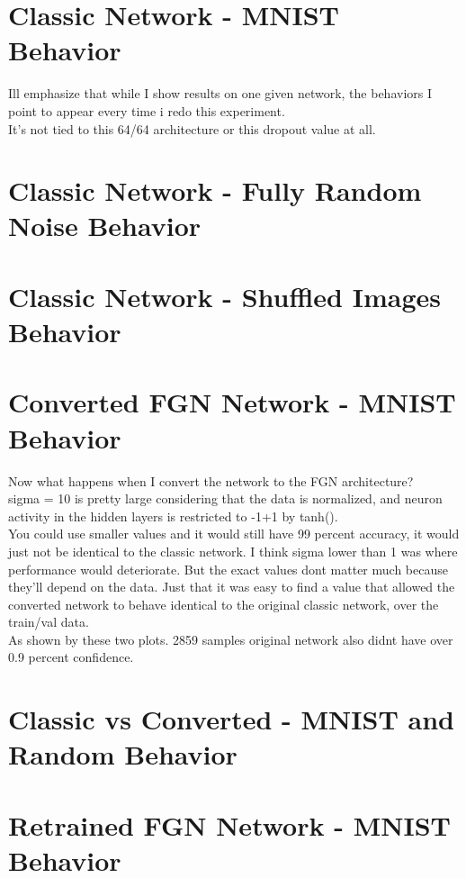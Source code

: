 \documentclass{article}
\begin{document}
\section{Classic Network - MNIST Behavior}
Ill emphasize that while I show results on one given network, the behaviors I point to appear every time i redo this experiment. \\
It's not tied to this 64/64 architecture or this dropout value at all.\\

\section{Classic Network - Fully Random Noise Behavior}

\section{Classic Network - Shuffled Images Behavior}

\section{Converted FGN Network - MNIST Behavior}
Now what happens when I convert the network to the FGN architecture?\\
sigma = 10 is pretty large considering that the data is normalized, and neuron activity in the hidden layers is restricted to -1+1 by tanh().\\
You could use smaller values and it would still have 99 percent accuracy, it would just not be identical to the classic network. I think sigma lower than 1 was where performance would deteriorate. But the exact values dont matter much because they'll depend on the data. Just that it was easy to find a value that allowed the converted network to behave identical to the original classic network, over the train/val data.\\
As shown by these two plots. 2859 samples  original network also didnt have over 0.9 percent confidence.

\section{Classic vs Converted - MNIST and Random Behavior}

\section{Retrained FGN Network - MNIST Behavior}
\end{document}
